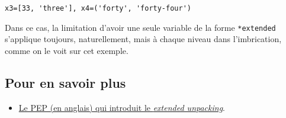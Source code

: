     \begin{Verbatim}[commandchars=\\\{\}]
x3=[33, 'three'], x4=('forty', 'forty-four')

    \end{Verbatim}

    Dans ce cas, la limitation d'avoir une seule variable de la forme
\texttt{*extended} s'applique toujours, naturellement, mais à chaque
niveau dans l'imbrication, comme on le voit sur cet exemple.

    \hypertarget{pour-en-savoir-plus}{%
\subsection{Pour en savoir plus}\label{pour-en-savoir-plus}}

\begin{itemize}
\tightlist
\item
  \href{https://www.python.org/dev/peps/pep-3132/}{Le PEP (en anglais)
  qui introduit le \emph{extended unpacking}}.
\end{itemize}